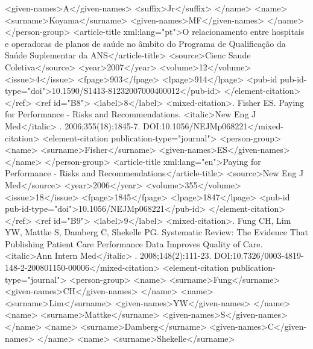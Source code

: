               <given-names>A</given-names>
              <suffix>Jr</suffix>
            </name>
            <name>
              <surname>Koyama</surname>
              <given-names>MF</given-names>
            </name>
          </person-group>
          <article-title xml:lang="pt">O relacionamento entre hospitais e operadoras de planos de
            saúde no âmbito do Programa de Qualificação da Saúde Suplementar da ANS</article-title>
          <source>Cienc Saude Coletiva</source>
          <year>2007</year>
          <volume>12</volume>
          <issue>4</issue>
          <fpage>903</fpage>
          <lpage>914</lpage>
          <pub-id pub-id-type="doi">10.1590/S1413-81232007000400012</pub-id>
        </element-citation>
      </ref>
      <ref id="B8">
        <label>8</label>
        <mixed-citation>. Fisher ES. Paying for Performance - Risks and Recommendations. <italic>New
            Eng J Med</italic> . 2006;355(18):1845-7. DOI:10.1056/NEJMp068221</mixed-citation>
        <element-citation publication-type="journal">
          <person-group>
            <name>
              <surname>Fisher</surname>
              <given-names>ES</given-names>
            </name>
          </person-group>
          <article-title xml:lang="en">Paying for Performance - Risks and
            Recommendations</article-title>
          <source>New Eng J Med</source>
          <year>2006</year>
          <volume>355</volume>
          <issue>18</issue>
          <fpage>1845</fpage>
          <lpage>1847</lpage>
          <pub-id pub-id-type="doi">10.1056/NEJMp068221</pub-id>
        </element-citation>
      </ref>
      <ref id="B9">
        <label>9</label>
        <mixed-citation>. Fung CH, Lim YW, Mattke S, Damberg C, Shekelle PG. Systematic Review: The
          Evidence That Publishing Patient Care Performance Data Improves Quality of Care.
            <italic>Ann Intern Med</italic> . 2008;148(2):111-23.
          DOI:10.7326/0003-4819-148-2-200801150-00006</mixed-citation>
        <element-citation publication-type="journal">
          <person-group>
            <name>
              <surname>Fung</surname>
              <given-names>CH</given-names>
            </name>
            <name>
              <surname>Lim</surname>
              <given-names>YW</given-names>
            </name>
            <name>
              <surname>Mattke</surname>
              <given-names>S</given-names>
            </name>
            <name>
              <surname>Damberg</surname>
              <given-names>C</given-names>
            </name>
            <name>
              <surname>Shekelle</surname>
